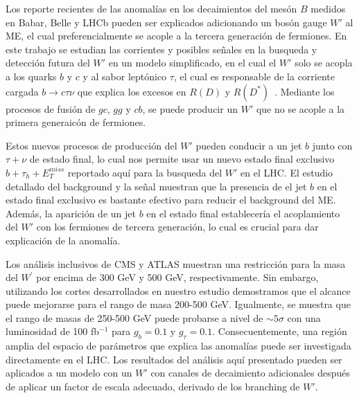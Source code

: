 \label{Ch:Conclusiones}
Los reporte recientes de las anomalías en los decaimientos del mesón $B$ medidos en Babar, Belle y LHCb pueden ser explicados adicionando un bosón gauge $W'$ al ME, el cual preferencialmente se acople a la tercera generación de fermiones. En este trabajo se estudian las corrientes y posibles señales en la busqueda y detección futura del $W'$ en un modelo simplificado, en el cual el $W'$ solo se acopla a los quarks $b$ y $c$ y al sabor leptónico $\tau$, el cual es responsable de la corriente cargada $b \to c \tau \nu$ que explica los excesos en $R(D)$ y $R(D^*)$~\cite{Abdullah:2018ets}. Mediante los procesos de fusión de $g c$, $g g$ y $c b$, se puede producir un $W'$ que no se acople a la primera generaicón de  fermiones.

Estos nuevos procesos de producción del $W'$ pueden conducir a un jet $b$ junto con $\tau+\nu$ de estado final, lo cual nos permite usar un nuevo estado final exclusivo $b+\tau_h+E^{miss}_T$ reportado aquí para la busqueda del $W'$ en el LHC. El estudio detallado del background y la señal muestran que la presencia de el jet $b$ en el estado final exclusivo es bastante efectivo para reducir el background del ME. Además, la aparición de un jet $b$ en el estado final establecería el acoplamiento del $W'$ con los fermiones de tercera generación, lo cual es crucial para dar explicación de la anomalía.

Los análisis inclusivos de CMS y ATLAS muestran una restricción para la masa del $W^\prime$ por encima de 300 GeV y 500 GeV, respectivamente. Sin embargo, utilizando los cortes desarrollados en nuestro estudio demostramos que el alcance puede mejorarse para el rango de masa 200-500 GeV. Igualmente, se muestra que el rango de masas de 250-500 GeV puede probarse a nivel de $\sim 5 \sigma$ con una luminosidad de 100 fb$^{- 1}$ para $g_b = 0.1$ y $g_\tau = 0.1$. Consecuentemente, una región amplia del espacio de parámetros que explica las anomalías puede ser investigada directamente en el LHC. Los resultados del análisis aquí presentado pueden ser aplicados a un modelo con un $W'$ con canales de decaimiento adicionales después de aplicar un factor de escala adecuado, derivado de los branching de $W'$. 